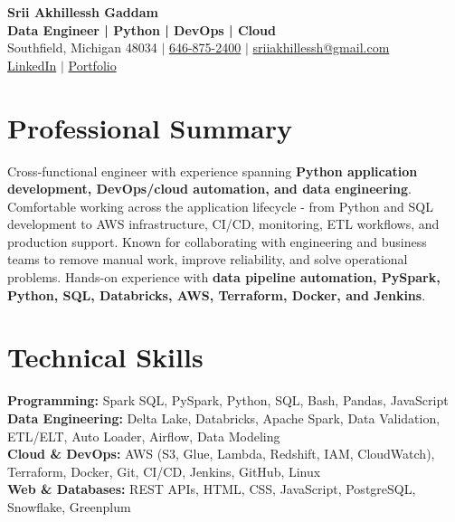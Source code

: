 \documentclass[letterpaper,10pt]{article}
\begin{document}
\fontsize{9.35pt}{10.45pt}\selectfont

\begin{center}
    {\LARGE \textbf{Srii Akhillessh Gaddam}} \\[-1pt]
    \textbf{Data Engineer | Python | DevOps | Cloud} \\[2pt]
    Southfield, Michigan 48034 $|$
    \href{tel:6468752400}{646-875-2400} $|$
    \href{mailto:sriiakhillessh@gmail.com}{sriiakhillessh@gmail.com} \\[1pt]
    \href{https://www.linkedin.com/in/srii-akhiilessh-gaddam-b48668191/}{LinkedIn} $|$
    \href{https://sriiakhillesshg.github.io/portfolio/}{Portfolio}
\end{center}
\vspace{-8pt}

\section{Professional Summary}
\small{Cross-functional engineer with experience spanning \textbf{Python application development, DevOps/cloud automation, and data engineering}. Comfortable working across the application lifecycle - from Python and SQL development to AWS infrastructure, CI/CD, monitoring, ETL workflows, and production support. Known for collaborating with engineering and business teams to remove manual work, improve reliability, and solve operational problems. Hands-on experience with \textbf{data pipeline automation, PySpark, Python, SQL, Databricks, AWS, Terraform, Docker, and Jenkins}.}

\section{Technical Skills}
\small{
\textbf{Programming:} Spark SQL, PySpark, Python, SQL, Bash, Pandas, JavaScript \\
\textbf{Data Engineering:} Delta Lake, Databricks, Apache Spark, Data Validation, ETL/ELT, Auto Loader, Airflow, Data Modeling \\
\textbf{Cloud \& DevOps:} AWS (S3, Glue, Lambda, Redshift, IAM, CloudWatch), Terraform, Docker, Git, CI/CD, Jenkins, GitHub, Linux \\
\textbf{Web \& Databases:} REST APIs, HTML, CSS, JavaScript, PostgreSQL, Snowflake, Greenplum
}

\end{document}

